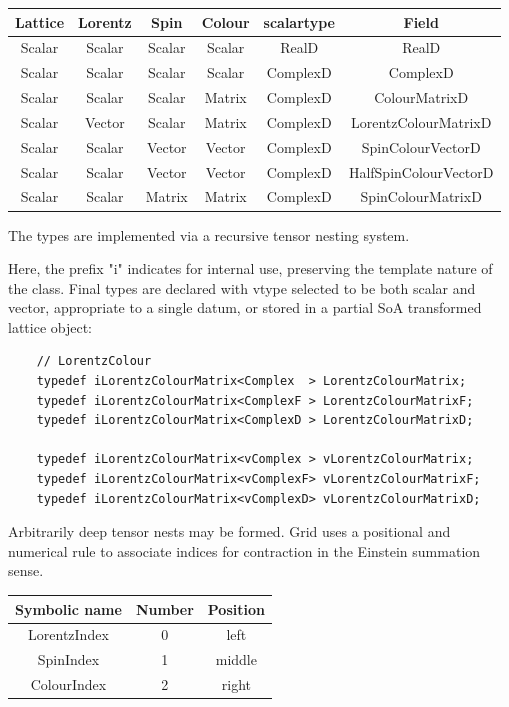 \documentclass[letter,10pt]{report}
\begin{document}
\begin{tabular}{cccccc}
\hline
Lattice &  Lorentz &   Spin &   Colour & scalartype & Field \\
\hline
Scalar  &  Scalar &    Scalar & Scalar & RealD     &    RealD \\
Scalar  &  Scalar &    Scalar & Scalar & ComplexD  &    ComplexD \\
Scalar  &  Scalar &    Scalar & Matrix & ComplexD  &    ColourMatrixD \\
Scalar  &  Vector &    Scalar & Matrix & ComplexD  &    LorentzColourMatrixD \\
Scalar  &  Scalar &    Vector & Vector & ComplexD  &    SpinColourVectorD \\
Scalar  &  Scalar &    Vector & Vector & ComplexD  &    HalfSpinColourVectorD \\
Scalar  &  Scalar &    Matrix & Matrix & ComplexD  &    SpinColourMatrixD \\
\hline
\end{tabular}

The types are implemented via a recursive tensor nesting system.

Here, the prefix "i" indicates for internal use, preserving the template nature of the class. 
Final types are declared with vtype selected to be both scalar and vector, appropriate to a
single datum, or stored in a partial SoA transformed lattice object:

\begin{verbatim}
    // LorentzColour
    typedef iLorentzColourMatrix<Complex  > LorentzColourMatrix;
    typedef iLorentzColourMatrix<ComplexF > LorentzColourMatrixF;
    typedef iLorentzColourMatrix<ComplexD > LorentzColourMatrixD;

    typedef iLorentzColourMatrix<vComplex > vLorentzColourMatrix;
    typedef iLorentzColourMatrix<vComplexF> vLorentzColourMatrixF;
    typedef iLorentzColourMatrix<vComplexD> vLorentzColourMatrixD;
\end{verbatim}

Arbitrarily deep tensor nests may be formed. Grid uses a positional and numerical rule to associate indices for contraction
in the Einstein summation sense.

\begin{tabular}{ccc}
\hline
Symbolic name &  Number &  Position\\
\hline
LorentzIndex  &   0 &       left\\
SpinIndex     &   1 &       middle\\
ColourIndex   &   2 &       right\\
\hline
\end{tabular}
\end{document}
